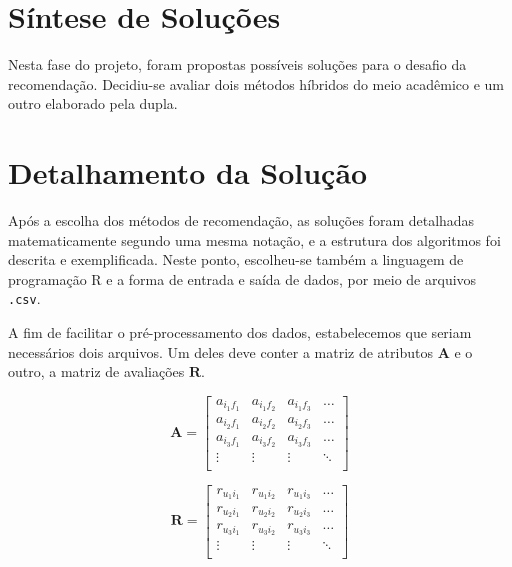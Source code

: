 \section{Síntese de Soluções} %
\label{sec:s_ntese_de_solu_es}


Nesta fase do projeto, foram propostas possíveis soluções para o desafio da recomendação. Decidiu-se avaliar dois métodos híbridos do meio acadêmico e um outro elaborado pela dupla. 

\section{Detalhamento da Solução} %
\label{sec:detalhamento_da_solu_o}


Após a escolha dos métodos de recomendação, as soluções foram detalhadas matematicamente segundo uma mesma notação, e a estrutura dos algoritmos foi descrita e exemplificada. Neste ponto, escolheu-se também a linguagem de programação R e a forma de entrada e saída de dados, por meio de arquivos \texttt{.csv}.

A fim de facilitar o pré-processamento dos dados, estabelecemos que seriam necessários dois arquivos. Um deles deve conter a matriz de atributos $\mathbf{A}$ e o outro, a matriz de avaliações  $\mathbf{R}$. 

\begin{equation} 
\mathbf{A} = 
\begin{bmatrix} 
 a_{i_1 f_1} &  a_{i_1 f_2} &  a_{i_1 f_3}  & \dots   \\
 a_{i_2 f_1} &  a_{i_2 f_2} &  a_{i_2 f_3}  & \dots   \\
 a_{i_3 f_1} &  a_{i_3 f_2} &  a_{i_3 f_3}  & \dots  \\ 
 \vdots &  \vdots &  \vdots  & \ddots   \\
 \end{bmatrix}
\end{equation}


\begin{equation}
	  \mathbf{R} = 
\begin{bmatrix} 
  r_{u_1 i_1} &  r_{u_1 i_2} &  r_{u_1 i_3}  & \dots   \\
 r_{u_2 i_1} &  r_{u_2 i_2} &  r_{u_2 i_3}  & \dots   \\
 r_{u_3 i_1} &  r_{u_3 i_2} &  r_{u_3 i_3}  & \dots  \\ 
 \vdots &  \vdots &  \vdots  & \ddots   \\
\end{bmatrix}
\end{equation}

